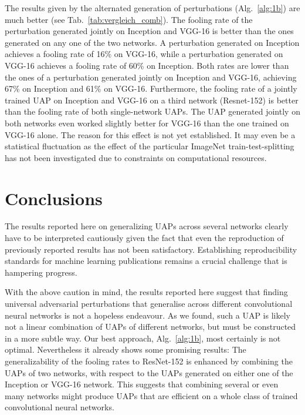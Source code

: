 \documentclass[runningheads]{llncs}
\begin{document}
The results given by the alternated generation of perturbations (Alg.~\ref{alg:1b}) are much better (see Tab.~\ref{tab:vergleich_comb}). The fooling rate of the perturbation generated jointly on Inception and VGG-16 is better than the ones generated on any one of the 
two networks. A perturbation generated on Inception achieves a fooling rate of 16\% on VGG-16, while a perturbation generated on VGG-16 achieves a fooling rate of 60\% on Inception. Both rates are lower than the ones of a perturbation generated jointly on Inception and VGG-16, achieving 67\% on Inception and 61\% on VGG-16. Furthermore, the fooling rate of a jointly trained UAP on Inception and VGG-16 on a third network (Resnet-152) is better than the fooling rate of both single-network UAPs. The UAP generated jointly on both networks even worked slightly better for VGG-16 than the one trained on VGG-16 alone. The reason for this effect is not yet established. It may even be a statistical fluctuation as the effect of the particular ImageNet train-test-splitting has not been investigated due to constraints on computational resources. 

\section{Conclusions}\label{sec:conclusion}
The results reported here on generalizing UAPs across several networks clearly have to be interpreted cautiously given the fact that even the reproduction of previously reported results has not been satisfactory. Establishing reproducibility standards for machine learning publications remains a crucial challenge that is hampering progress.

With the above caution in mind, the results reported here suggest that finding universal adversarial perturbations that generalise across different convolutional neural networks is not a hopeless endeavour. As we found, such a UAP is likely not a linear combination of UAPs of different networks, but must be constructed in a more subtle way. Our best approach, Alg.~\ref{alg:1b}, most certainly is not optimal. Nevertheless it already shows some promising results: The generalizability of the fooling rates to ResNet-152 is enhanced by combining the UAPs of two networks, with respect to the UAPs generated on either one of the Inception or VGG-16 network. This suggests that combining several or even many networks might produce UAPs that are efficient on a whole class of trained 
convolutional neural networks.


\end{document}
